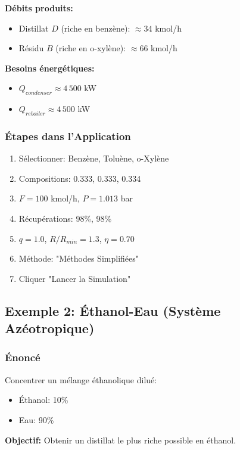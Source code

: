 \documentclass[11pt,a4paper]{article}
\begin{document}
\textbf{Débits produits:}
\begin{itemize}[leftmargin=*]
    \item Distillat $D$ (riche en benzène): $\approx 34$ kmol/h
    \item Résidu $B$ (riche en o-xylène): $\approx 66$ kmol/h
\end{itemize}

\textbf{Besoins énergétiques:}
\begin{itemize}[leftmargin=*]
    \item $Q_{condenser} \approx 4\,500$ kW
    \item $Q_{reboiler} \approx 4\,500$ kW
\end{itemize}

\subsubsection{Étapes dans l'Application}

\begin{enumerate}[leftmargin=*]
    \item Sélectionner: Benzène, Toluène, o-Xylène
    \item Compositions: 0.333, 0.333, 0.334
    \item $F = 100$ kmol/h, $P = 1.013$ bar
    \item Récupérations: 98\%, 98\%
    \item $q = 1.0$, $R/R_{min} = 1.3$, $\eta = 0.70$
    \item Méthode: "Méthodes Simplifiées"
    \item Cliquer "Lancer la Simulation"
\end{enumerate}

\subsection{Exemple 2: Éthanol-Eau (Système Azéotropique)}

\subsubsection{Énoncé}

Concentrer un mélange éthanolique dilué:
\begin{itemize}[leftmargin=*]
    \item Éthanol: 10\%
    \item Eau: 90\%
\end{itemize}

\textbf{Objectif:} Obtenir un distillat le plus riche possible en éthanol.
\end{document}
